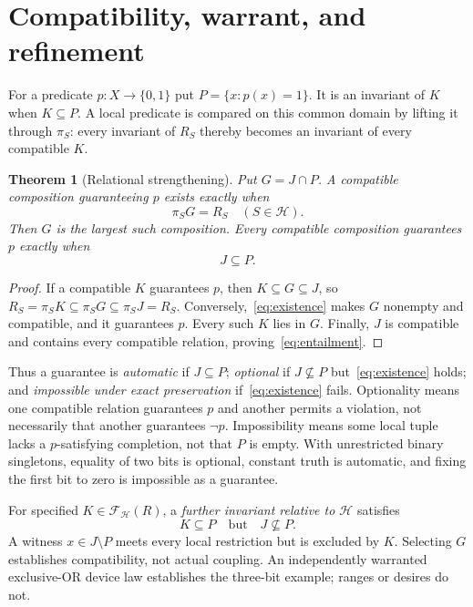 \documentclass[11pt]{article}
\newtheorem{theorem}{Theorem}
\newcommand{\cF}{\mathcal F}
\newcommand{\cH}{\mathcal H}
\begin{document}
\section{Compatibility, warrant, and refinement}\label{sec:determination}
For a predicate $p:X\to\{0,1\}$ put $P=\{x:p(x)=1\}$. It is an invariant of $K$ when $K\subseteq P$. A local predicate is compared on this common domain by lifting it through $\pi_S$: every invariant of $R_S$ thereby becomes an invariant of every compatible $K$.

\begin{theorem}[Relational strengthening]\label{thm:relational}
Put $G=J\cap P$. A compatible composition guaranteeing $p$ exists exactly when
\begin{equation}\label{eq:existence}
\pi_SG=R_S\quad(S\in\cH).
\end{equation}
Then $G$ is the largest such composition. Every compatible composition guarantees $p$ exactly when
\begin{equation}\label{eq:entailment}
J\subseteq P.
\end{equation}
\end{theorem}
\begin{proof}
If a compatible $K$ guarantees $p$, then $K\subseteq G\subseteq J$, so
$R_S=\pi_SK\subseteq\pi_SG\subseteq\pi_SJ=R_S$.
Conversely,~\eqref{eq:existence} makes $G$ nonempty and compatible, and it guarantees $p$. Every such $K$ lies in $G$. Finally, $J$ is compatible and contains every compatible relation, proving~\eqref{eq:entailment}.
\end{proof}
Thus a guarantee is \emph{automatic} if $J\subseteq P$; \emph{optional} if $J\nsubseteq P$ but~\eqref{eq:existence} holds; and \emph{impossible under exact preservation} if~\eqref{eq:existence} fails. Optionality means one compatible relation guarantees $p$ and another permits a violation, not necessarily that another guarantees $\neg p$. Impossibility means some local tuple lacks a $p$-satisfying completion, not that $P$ is empty. With unrestricted binary singletons, equality of two bits is optional, constant truth is automatic, and fixing the first bit to zero is impossible as a guarantee.

For specified $K\in\cF_{\cH}(R)$, a \emph{further invariant relative to $\cH$} satisfies
\begin{equation}\label{eq:further}
K\subseteq P\quad\text{but}\quad J\nsubseteq P.
\end{equation}
A witness $x\in J\setminus P$ meets every local restriction but is excluded by $K$. Selecting $G$ establishes compatibility, not actual coupling. An independently warranted exclusive-OR device law establishes the three-bit example; ranges or desires do not.
\end{document}

